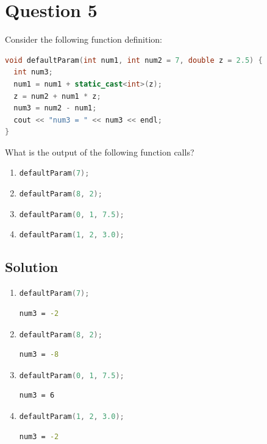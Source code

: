 \documentclass[a4paper, 10pt]{article}
\begin{document}
  \newpage
  \section{Question 5}
    Consider the following function definition:

    \begin{lstlisting}[language=c++]
void defaultParam(int num1, int num2 = 7, double z = 2.5) {
  int num3;
  num1 = num1 + static_cast<int>(z);
  z = num2 + num1 * z;
  num3 = num2 - num1;
  cout << "num3 = " << num3 << endl;
}
    \end{lstlisting}

    What is the output of the following function calls?
      \begin{enumerate}[label=\Alph*.]
        \item \lstinline[language=c++,columns=fixed]
          {defaultParam(7);}
        \item \lstinline[language=c++,columns=fixed]
          {defaultParam(8, 2);}
        \item \lstinline[language=c++,columns=fixed]
          {defaultParam(0, 1, 7.5);}
        \item \lstinline[language=c++,columns=fixed]
          {defaultParam(1, 2, 3.0);}
      \end{enumerate}
    \subsection{Solution}
      \begin{enumerate}[label=\alph*.]
        \item \lstinline[language=c++,columns=fixed]
          {defaultParam(7);}

          \begin{lstlisting}[language=bash,caption=5a Solution]
num3 = -2
          \end{lstlisting}
        \item \lstinline[language=c++,columns=fixed]
          {defaultParam(8, 2);}

          \begin{lstlisting}[language=bash,caption=5b Solution]
num3 = -8
          \end{lstlisting}
        \item \lstinline[language=c++,columns=fixed]
          {defaultParam(0, 1, 7.5);}

          \begin{lstlisting}[language=bash,caption=5c Solution]
num3 = 6
          \end{lstlisting}
        \item \lstinline[language=c++,columns=fixed]
          {defaultParam(1, 2, 3.0);}

          \begin{lstlisting}[language=bash,caption=5d Solution]
num3 = -2
          \end{lstlisting}
      \end{enumerate}
\end{document}
